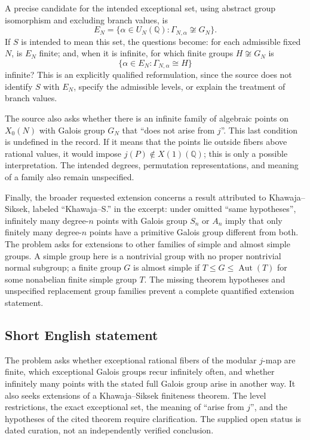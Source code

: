 \documentclass[11pt]{article}
\newcommand{\Q}{\mathbb{Q}}
\begin{document}
A precise candidate for the intended exceptional set, using abstract group isomorphism and excluding branch values, is
\[
E_N=\{\alpha\in U_N(\Q):\Gamma_{N,\alpha}\not\cong G_N\}.
\]
If \(S\) is intended to mean this set, the questions become: for each admissible fixed \(N\), is \(E_N\) finite; and, when it is infinite, for which finite groups \(H\not\cong G_N\) is
\[
\{\alpha\in E_N:\Gamma_{N,\alpha}\cong H\}
\]
infinite? This is an explicitly qualified reformulation, since the source does not identify \(S\) with \(E_N\), specify the admissible levels, or explain the treatment of branch values.

The source also asks whether there is an infinite family of algebraic points on \(X_0(N)\) with Galois group \(G_N\) that ``does not arise from \(j\)''. This last condition is undefined in the record. If it means that the points lie outside fibers above rational values, it would impose \(j(P)\notin X(1)(\Q)\); this is only a possible interpretation. The intended degrees, permutation representations, and meaning of a family also remain unspecified.

Finally, the broader requested extension concerns a result attributed to Khawaja--Siksek, labeled ``Khawaja--S.'' in the excerpt: under omitted ``same hypotheses'', infinitely many degree-\(n\) points with Galois group \(S_n\) or \(A_n\) imply that only finitely many degree-\(n\) points have a primitive Galois group different from both. The problem asks for extensions to other families of simple and almost simple groups. A simple group here is a nontrivial group with no proper nontrivial normal subgroup; a finite group \(G\) is almost simple if \(T\leq G\leq\operatorname{Aut}(T)\) for some nonabelian finite simple group \(T\). The missing theorem hypotheses and unspecified replacement group families prevent a complete quantified extension statement.
\subsection{Short English statement}
The problem asks whether exceptional rational fibers of the modular \(j\)-map are finite, which exceptional Galois groups recur infinitely often, and whether infinitely many points with the stated full Galois group arise in another way. It also seeks extensions of a Khawaja--Siksek finiteness theorem. The level restrictions, the exact exceptional set, the meaning of ``arise from \(j\)'', and the hypotheses of the cited theorem require clarification. The supplied open status is dated curation, not an independently verified conclusion.
\end{document}
